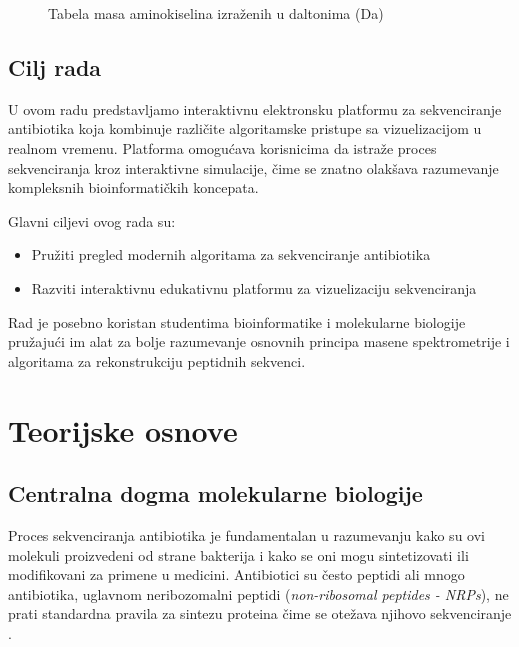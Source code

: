 \documentclass[12pt,oneside]{memoir}
\begin{document}
\begin{figure}[h]
  \centering
  
  \caption{Tabela masa aminokiselina izraženih u daltonima (Da)}
  \label{fig:aminokiseline}
\end{figure}

\section{Cilj rada}
U ovom radu predstavljamo interaktivnu elektronsku platformu za sekvenciranje antibiotika koja kombinuje različite algoritamske pristupe sa vizuelizacijom u realnom vremenu. Platforma omogućava korisnicima da istraže proces sekvenciranja kroz interaktivne simulacije, čime se znatno olakšava razumevanje kompleksnih bioinformatičkih koncepata.

Glavni ciljevi ovog rada su:
\begin{itemize}
    \item Pružiti pregled modernih algoritama za sekvenciranje antibiotika
    \item Razviti interaktivnu edukativnu platformu za vizuelizaciju sekvenciranja
\end{itemize}

Rad je posebno koristan studentima bioinformatike i molekularne biologije pružajući im alat za bolje razumevanje osnovnih principa masene spektrometrije i algoritama za rekonstrukciju peptidnih sekvenci.

\chapter{Teorijske osnove}

\section{Centralna dogma molekularne biologije}
Proces sekvenciranja antibiotika je fundamentalan u razumevanju kako su ovi molekuli proizvedeni od strane bakterija i kako se oni mogu sintetizovati ili modifikovani za primene u medicini. Antibiotici su često peptidi ali mnogo antibiotika, uglavnom neribozomalni peptidi (\emph{non-ribosomal peptides - NRPs}), ne prati standardna pravila za sintezu proteina čime se otežava njihovo sekvenciranje \cite{online_lecture, online_book}.
\end{document}
